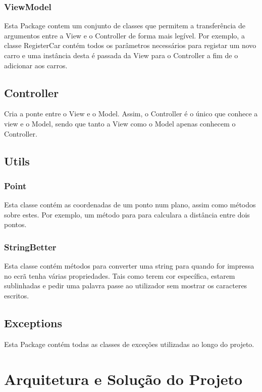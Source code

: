 \documentclass[a4paper]{report}
\begin{document}
\subsection{ViewModel}

Esta Package contem um conjunto de classes que permitem a transferência de argumentos
entre a View e o Controller de forma mais legível. Por exemplo, a classe RegisterCar
contém todos os parâmetros necessários para registar um novo carro e uma instância desta
é passada da View para o Controller a fim de o adicionar aos carros.

\section{Controller}

Cria a ponte entre o View e o Model. Assim, o Controller é o único que conhece a view e o
Model, sendo que tanto a View como o Model apenas conhecem o Controller.

\section{Utils}

\subsection{Point}

Esta classe contém as coordenadas de um ponto num plano, assim como métodos sobre estes.
Por exemplo, um método para para calculara a distância entre dois pontos.

\subsection{StringBetter}

Esta classe contém métodos para converter uma string para quando for
impressa no ecrã tenha várias propriedades. Tais como terem cor
específica, estarem sublinhadas e pedir uma palavra passe ao utilizador sem mostrar os caracteres escritos.

\section{Exceptions}

Esta Package contém todas as classes de exceções utilizadas ao longo do projeto.

\chapter{Arquitetura e Solução do Projeto}
\end{document}

